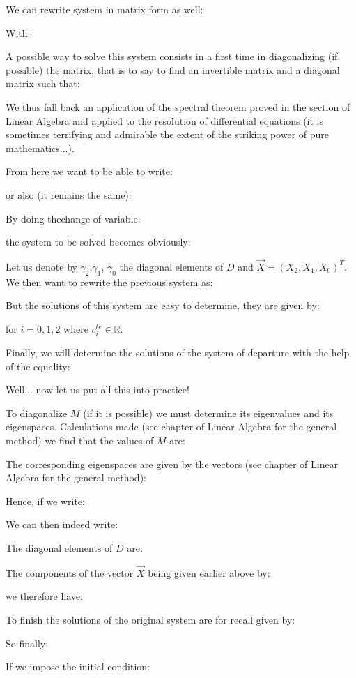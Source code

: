 	We can rewrite system in matrix form as well:
	
	With:
	
	A possible way to solve this system consists in a first time in diagonalizing (if possible) the matrix, that is to say to find an invertible matrix and a diagonal matrix such that:
	
	We thus fall back an application of the spectral theorem proved in the section of Linear Algebra and applied to the resolution of differential equations (it is sometimes terrifying and admirable the extent of the striking power of pure mathematics...).
	
	From here we want to be able to write:
	
	or also (it remains the same):
	
	By doing thechange of variable:
	
	the system to be solved becomes obviously:
	
 	Let us denote by $\gamma_2$,$\gamma_1$, $\gamma_0$ the diagonal elements of $D$ and $\vec{X}=(X_2,X_1,X_0)^T$. We then want to rewrite the previous system as:
	
	But the solutions of this system are easy to determine, they are given by:
	
	for $i=0,1,2$ where $c_i^{te}\in \mathbb{R}$.

	Finally, we will determine the solutions of the system of departure with the help of the equality:
	
	Well... now let us put all this into practice!

	To diagonalize $M$ (if it is possible) we must determine its eigenvalues and its eigenspaces. Calculations made (see chapter of Linear Algebra for the general method) we find that the values of $M$ are:
	
	The corresponding eigenspaces are given by the vectors (see chapter of Linear Algebra for the general method):
	
	Hence, if we write:
	
	We can then indeed write:
	
	The diagonal elements of $D$ are:
	
	The components of the vector $\vec{X}$ being given earlier above by:
	
	we therefore have:
 	
	To finish the solutions of the original system are for recall given by:
	
	So finally:
	
 	If we impose the initial condition:
	
